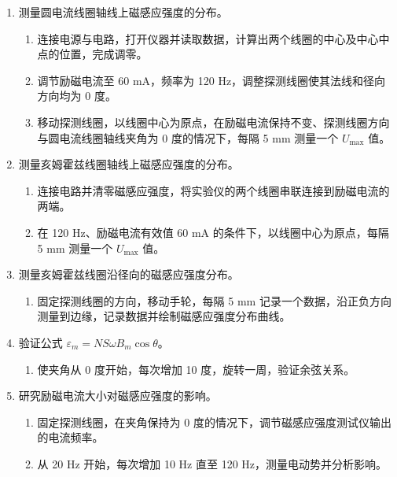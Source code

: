 \documentclass[a4paper,10pt]{article}
\begin{document}
\begin{enumerate}
    \item 测量圆电流线圈轴线上磁感应强度的分布。
    \begin{enumerate}
        \item 连接电源与电路，打开仪器并读取数据，计算出两个线圈的中心及中心中点的位置，完成调零。
        \item 调节励磁电流至 60 mA，频率为 120 Hz，调整探测线圈使其法线和径向方向均为 0 度。
        \item 移动探测线圈，以线圈中心为原点，在励磁电流保持不变、探测线圈方向与圆电流线圈轴线夹角为 0 度的情况下，每隔 5 mm 测量一个 \( U_{\text{max}} \) 值。
    \end{enumerate}

    \item 测量亥姆霍兹线圈轴线上磁感应强度的分布。
    \begin{enumerate}
        \item 连接电路并清零磁感应强度，将实验仪的两个线圈串联连接到励磁电流的两端。
        \item 在 120 Hz、励磁电流有效值 60 mA 的条件下，以线圈中心为原点，每隔 5 mm 测量一个 \( U_{\text{max}} \) 值。
    \end{enumerate}

    \item 测量亥姆霍兹线圈沿径向的磁感应强度分布。
    \begin{enumerate}
        \item 固定探测线圈的方向，移动手轮，每隔 5 mm 记录一个数据，沿正负方向测量到边缘，记录数据并绘制磁感应强度分布曲线。
    \end{enumerate}

    \item 验证公式 \( \varepsilon_m = NS\omega B_m \cos \theta \)。
    \begin{enumerate}
        \item 使夹角从 0 度开始，每次增加 10 度，旋转一周，验证余弦关系。
    \end{enumerate}

    \item 研究励磁电流大小对磁感应强度的影响。
    \begin{enumerate}
        \item 固定探测线圈，在夹角保持为 0 度的情况下，调节磁感应强度测试仪输出的电流频率。
        \item 从 20 Hz 开始，每次增加 10 Hz 直至 120 Hz，测量电动势并分析影响。
    \end{enumerate}
\end{enumerate}
\end{document}

